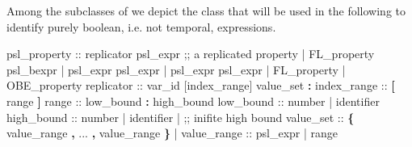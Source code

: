 %
Among the subclasses of  we depict the class
 that will be used in the following to identify purely
boolean, i.e. not temporal, expressions.
\begin{Grammar}
psl_property :: 
   replicator psl_expr ;; a replicated property 
 | FL_property  psl_bexpr
 | psl_expr \operator{<->} psl_expr
 | psl_expr \operator{->} psl_expr
 | FL_property       
 | OBE_property      
replicator :: 
    var_id [index_range]  value_set \textbf{:} 
index_range :: 
   \textbf{[} range \textbf{]} 
range :: 
   low_bound \textbf{:} high_bound 
low_bound :: 
   number              
 | identifier         
high_bound :: 
   number 
 | identifier
 |              ;; inifite high bound 
value_set :: 
   \textbf{\{} value_range \textbf{,} ... \textbf{,} value_range \textbf{\}}
 | 
value_range :: 
   psl_expr
 | range
\end{Grammar}
%
